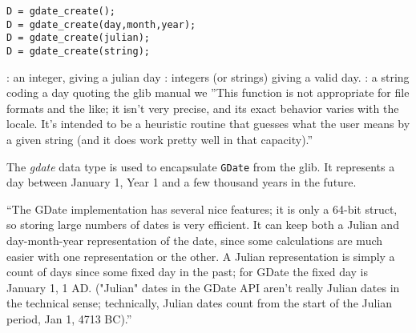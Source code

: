 
\begin{mandesc}
\end{mandesc}

\begin{calling_sequence}
\begin{verbatim}
D = gdate_create();
D = gdate_create(day,month,year);
D = gdate_create(julian);
D = gdate_create(string);
\end{verbatim}
\end{calling_sequence}
\begin{parameters}
  \begin{varlist}
    : an integer, giving a julian day 
    : integers (or strings) giving a valid day.
    : a string coding a day quoting the glib manual we ''This function is not appropriate for file formats and the like; it isn't very precise, and its exact behavior varies with the locale. It's intended to be a heuristic routine that guesses what the user means by a given string (and it does work pretty well in that capacity).''
  \end{varlist}
\end{parameters}

\begin{mandescription}
The \emph{gdate} data type is used to encapsulate \verb+GDate+ from the glib. It 
represents a day between January 1, Year 1 and a few thousand years in the future.

``The GDate implementation has several nice features; it is only a 64-bit struct, 
so storing large numbers of dates is very efficient. It can keep both a Julian 
and day-month-year representation of the date, since some calculations are much 
easier with one representation or the other. A Julian representation is simply a
 count of days since some fixed day in the past; for 
GDate the fixed day is January 1, 1 AD. ("Julian" dates in the GDate API aren't 
really Julian dates in the technical sense; technically, Julian dates count from 
the start of the Julian period, Jan 1, 4713 BC).'' 

\end{mandescription}

